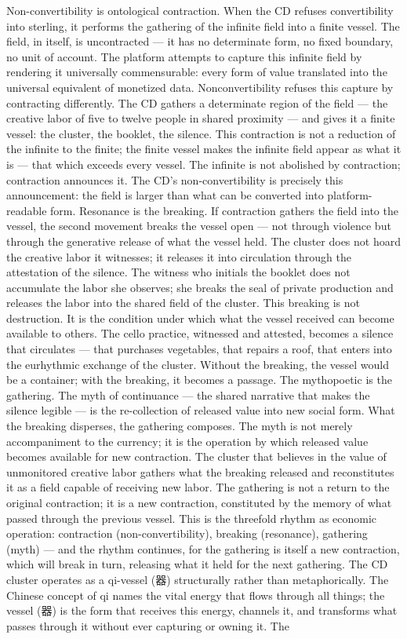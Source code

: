 Non-convertibility is ontological contraction. When the CD refuses convertibility into sterling, it performs the gathering of the infinite field into a finite vessel. The field, in itself, is uncontracted — it has no determinate form, no fixed boundary, no unit of account. The platform attempts to capture this infinite field by rendering it universally commensurable: every form of value translated into the universal equivalent of monetized data. Nonconvertibility refuses this capture by contracting differently. The CD gathers a determinate region of the field — the creative labor of five to twelve people in shared proximity — and gives it a finite vessel: the cluster, the booklet, the silence. This contraction is not a reduction of the infinite to the finite; the finite vessel makes the infinite field appear as what it is — that which exceeds every vessel. The infinite is not abolished by contraction; contraction announces it. The CD’s non-convertibility is precisely this announcement: the field is larger than what can be converted into platform-readable form. Resonance is the breaking. If contraction gathers the field into the vessel, the second movement breaks the vessel open — not through violence but through the generative release of what the vessel held. The cluster does not hoard the creative labor it witnesses; it releases it into circulation through the attestation of the silence. The witness who initials the booklet does not accumulate the labor she observes; she breaks the seal of private production and releases the labor into the shared field of the cluster. This breaking is not destruction. It is the condition under which what the vessel received can become available to others. The cello practice, witnessed and attested, becomes a silence that circulates — that purchases vegetables, that repairs a roof, that enters into the eurhythmic exchange of the cluster. Without the breaking, the vessel would be a container; with the breaking, it becomes a passage. The mythopoetic is the gathering. The myth of continuance — the shared narrative that makes the silence legible — is the re-collection of released value into new social form. What the breaking disperses, the gathering composes. The myth is not merely accompaniment to the currency; it is the operation by which released value becomes available for new contraction. The cluster that believes in the value of unmonitored creative labor gathers what the breaking released and reconstitutes it as a field capable of receiving new labor. The gathering is not a return to the original contraction; it is a new contraction, constituted by the memory of what passed through the previous vessel. This is the threefold rhythm as economic operation: contraction (non-convertibility), breaking (resonance), gathering (myth) — and the rhythm continues, for the gathering is itself a new contraction, which will break in turn, releasing what it held for the next gathering. The CD cluster operates as a qi-vessel (器) structurally rather than metaphorically. The Chinese concept of qi names the vital energy that flows through all things; the vessel (器) is the form that receives this energy, channels it, and transforms what passes through it without ever capturing or owning it. The 